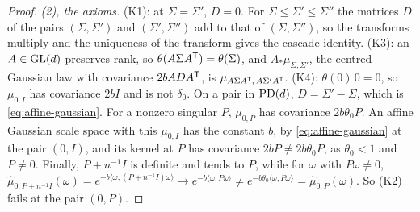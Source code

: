 \begin{proof}
\emph{(2), the axioms.} (K1): at $\Sigma = \Sigma'$, $D = 0$. For $\Sigma \le \Sigma' \le \Sigma''$ the
matrices $D$ of the pairs $(\Sigma, \Sigma')$ and $(\Sigma', \Sigma'')$ add to that of $(\Sigma, \Sigma'')$, so the
transforms multiply and the uniqueness of the transform gives the cascade identity. (K3): an $A \in \mathrm{GL}(d)$
preserves rank, so $\theta(A\Sigma A^{\mathsf{T}}) = \theta(\Sigma)$, and $A_*\mu_{\Sigma,\Sigma'}$, the centred Gaussian
law with covariance $2bADA^{\mathsf{T}}$, is $\mu_{A\Sigma A^{\mathsf{T}},\,A\Sigma'A^{\mathsf{T}}}$. (K4): $\theta(0)\,0 = 0$, so
$\mu_{0,I}$ has covariance $2bI$ and is not $\delta_0$. On a pair in $\mathrm{PD}(d)$, $D = \Sigma' - \Sigma$, which is
\ref{eq:affine-gaussian}. For a nonzero singular $P$, $\mu_{0,P}$ has covariance $2b\theta_0P$. An affine Gaussian scale space
with this $\mu_{0,I}$ has the constant $b$, by \ref{eq:affine-gaussian} at the pair $(0, I)$, and its kernel at $P$
has covariance $2bP \ne 2b\theta_0P$, as $\theta_0 < 1$ and $P \ne 0$. Finally, $P + n^{-1}I$ is
definite and tends to $P$, while for $\omega$ with $P\omega \ne 0$,
$\widehat\mu_{0,P+n^{-1}I}(\omega) = e^{-b\langle\omega,(P+n^{-1}I)\omega\rangle} \to e^{-b\langle\omega,P\omega\rangle}
\ne e^{-b\theta_0\langle\omega,P\omega\rangle} = \widehat\mu_{0,P}(\omega)$. So (K2) fails at the pair $(0, P)$.
\end{proof}

